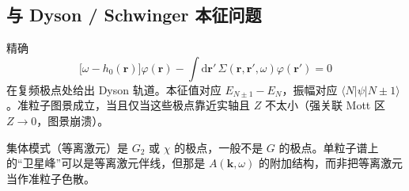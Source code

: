 \subsection{与 Dyson / Schwinger 本征问题}

精确
\begin{equation}
  \bigl[\omega-h_0(\mathbf{r})\bigr]\varphi(\mathbf{r})
  -\int\mathrm{d}\mathbf{r}'\,\Sigma(\mathbf{r},\mathbf{r}',\omega)\varphi(\mathbf{r}')
  =0
\end{equation}
在复频极点处给出 Dyson 轨道。本征值对应 $E_{N\pm1}-E_N$，振幅对应 $\langle N|\psi|N\pm1\rangle$。准粒子图景成立，当且仅当这些极点靠近实轴且 $Z$ 不太小（强关联 Mott 区 $Z\to0$，图景崩溃）。

\begin{note}
集体模式（等离激元）是 $G_2$ 或 $\chi$ 的极点，一般不是 $G$ 的极点。单粒子谱上的“卫星峰”可以是等离激元伴线，但那是 $A(\mathbf{k},\omega)$ 的附加结构，而非把等离激元当作准粒子色散。
\end{note}
